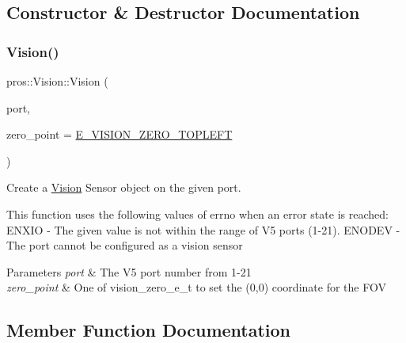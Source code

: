 \subsection{Constructor \& Destructor Documentation}
\mbox{\label{classpros_1_1Vision_a46cdaf74713f630b5bb5f4d0d3259dcd}} 
\subsubsection{\texorpdfstring{Vision()}{Vision()}}
{\footnotesize\ttfamily pros\+::\+Vision\+::\+Vision (\begin{DoxyParamCaption}\item[{std\+::uint8\+\_\+t}]{port,  }\item[{\hyperlink{vision_8h_a2e8bc1c48f8aab12275bfc1868fbbad6}{vision\+\_\+zero\+\_\+e\+\_\+t}}]{zero\+\_\+point = {\ttfamily \hyperlink{vision_8h_aef7c8269b3fb0dfbf4e597b2d8dd7af5a0ff244c5f3e9771f962986e25b00ff3d}{E\+\_\+\+V\+I\+S\+I\+O\+N\+\_\+\+Z\+E\+R\+O\+\_\+\+T\+O\+P\+L\+E\+FT}} }\end{DoxyParamCaption})}



Create a \hyperlink{classpros_1_1Vision}{Vision} Sensor object on the given port. 

This function uses the following values of errno when an error state is reached\+: E\+N\+X\+IO -\/ The given value is not within the range of V5 ports (1-\/21). E\+N\+O\+D\+EV -\/ The port cannot be configured as a vision sensor


\begin{DoxyParams}{Parameters}
{\em port} & The V5 port number from 1-\/21 \\
\hline
{\em zero\+\_\+point} & One of vision\+\_\+zero\+\_\+e\+\_\+t to set the (0,0) coordinate for the F\+OV \\
\hline
\end{DoxyParams}


\subsection{Member Function Documentation}
\mbox{\label{classpros_1_1Vision_a00f02cfb09ca224c2a7735be918e941d}} 
